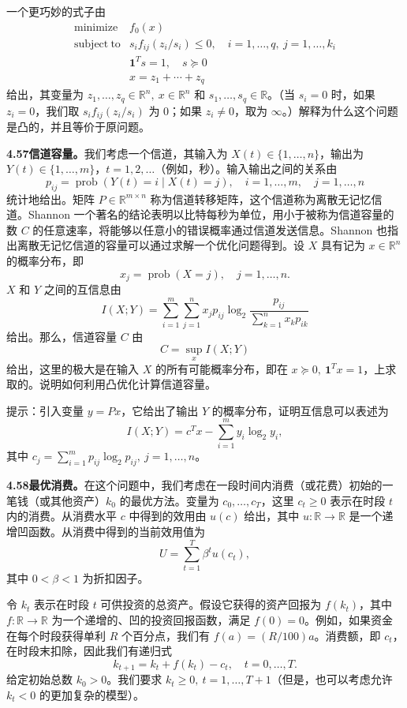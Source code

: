 \documentclass[UTF8,12pt,a4paper,fontset=fandol]{ctexart}
\begin{document}
一个更巧妙的式子由
\[
\begin{array}{ll}
\mathop{\mathrm{minimize}} & f_0(x)\\
\mathrm{subject\ to} & s_if_{ij}(z_i/s_i)\leq0,\quad i=1,\ldots,q,\ j=1,\ldots,k_i\\
& \mathbf{1}^Ts=1,\quad s\succeq0\\
& x=z_1+\cdots+z_q
\end{array}
\]
给出，其变量为 $z_1,\ldots,z_q\in\mathbb{R}^n,\ x\in\mathbb{R}^n$ 和 $s_1,\ldots,s_q\in\mathbb{R}$。（当 $s_i=0$ 时，如果 $z_i=0$，我们取 $s_if_{ij}(z_i/s_i)$ 为 0；如果 $z_i\neq0$，取为 $\infty$。）解释为什么这个问题是凸的，并且等价于原问题。

\noindent\textbf{4.57\quad 信道容量。}\quad 我们考虑一个信道，其输入为 $X(t)\in\{1,\ldots,n\}$，输出为 $Y(t)\in\{1,\ldots,m\}$，$t=1,2,\ldots$（例如，秒）。输入输出之间的关系由
\[
p_{ij}=\operatorname{prob}(Y(t)=i\mid X(t)=j),\quad i=1,\ldots,m,\quad j=1,\ldots,n
\]
统计地给出。矩阵 $P\in\mathbb{R}^{m\times n}$ 称为信道转移矩阵，这个信道称为离散无记忆信道。Shannon 一个著名的结论表明以比特每秒为单位，用小于被称为信道容量的数 $C$ 的任意速率，将能够以任意小的错误概率通过信道发送信息。Shannon 也指出离散无记忆信道的容量可以通过求解一个优化问题得到。设 $X$ 具有记为 $x\in\mathbb{R}^n$ 的概率分布，即
\[
x_j=\operatorname{prob}(X=j),\quad j=1,\ldots,n.
\]
$X$ 和 $Y$ 之间的互信息由
\[
I(X;Y)=\sum_{i=1}^m\sum_{j=1}^n x_jp_{ij}\log_2\frac{p_{ij}}{\sum_{k=1}^n x_kp_{ik}}
\]
给出。那么，信道容量 $C$ 由
\[
C=\sup_x I(X;Y)
\]
给出，这里的极大是在输入 $X$ 的所有可能概率分布，即在 $x\succeq0,\ \mathbf{1}^Tx=1$，上求取的。说明如何利用凸优化计算信道容量。

提示：引入变量 $y=Px$，它给出了输出 $Y$ 的概率分布，证明互信息可以表述为
\[
I(X;Y)=c^Tx-\sum_{i=1}^m y_i\log_2y_i,
\]
其中 $c_j=\sum_{i=1}^m p_{ij}\log_2p_{ij},\ j=1,\ldots,n$。

\noindent\textbf{4.58\quad 最优消费。}\quad 在这个问题中，我们考虑在一段时间内消费（或花费）初始的一笔钱（或其他资产）$k_0$ 的最优方法。变量为 $c_0,\ldots,c_T$，这里 $c_t\geq0$ 表示在时段 $t$ 内的消费。从消费水平 $c$ 中得到的效用由 $u(c)$ 给出，其中 $u:\mathbb{R}\to\mathbb{R}$ 是一个递增凹函数。从消费中得到的当前效用值为
\[
U=\sum_{t=1}^T\beta^tu(c_t),
\]
其中 $0<\beta<1$ 为折扣因子。

令 $k_t$ 表示在时段 $t$ 可供投资的总资产。假设它获得的资产回报为 $f(k_t)$，其中 $f:\mathbb{R}\to\mathbb{R}$ 为一个递增的、凹的投资回报函数，满足 $f(0)=0$。例如，如果资金在每个时段获得单利 $R$ 个百分点，我们有 $f(a)=(R/100)a$。消费额，即 $c_t$，在时段末扣除，因此我们有递归式
\[
k_{t+1}=k_t+f(k_t)-c_t,\quad t=0,\ldots,T.
\]
给定初始总数 $k_0>0$。我们要求 $k_t\geq0,\ t=1,\ldots,T+1$（但是，也可以考虑允许 $k_t<0$ 的更加复杂的模型）。
\end{document}
